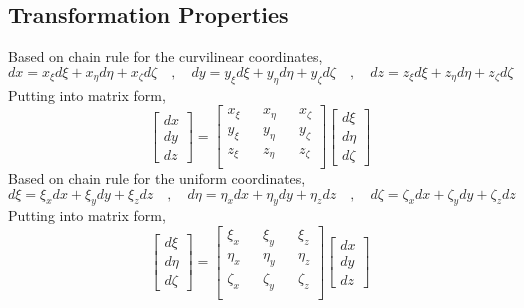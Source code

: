 \documentclass[a4paper, 12pt]{report}
\begin{document}
\begin{center}
\subsection{Transformation Properties}
\begin{comment}
Not Complete, Crammer's rule for all of the matrices are not writte down
\end{comment}
Based on chain rule for the curvilinear coordinates,
$$dx = x_{\xi}d\xi + x_{\eta}d\eta + x_{\zeta}d\zeta \quad,\quad dy = y_{\xi}d\xi + y_{\eta}d\eta + y_{\zeta}d\zeta \quad,\quad dz = z_{\xi}d\xi + z_{\eta}d\eta + z_{\zeta}d\zeta$$
Putting into matrix form,
\begin{equation}\begin{bmatrix}
dx \\ dy \\ dz
\end{bmatrix} = \begin{bmatrix}
x_{\xi} && x_{\eta} && x_{\zeta} \\
y_{\xi} && y_{\eta} && y_{\zeta} \\
z_{\xi} && z_{\eta} && z_{\zeta} \\
\end{bmatrix}\begin{bmatrix}
d\xi \\ d\eta \\ d\zeta
\end{bmatrix}
\label{curvilinear coordinate matrix}
\end{equation}
Based on chain rule for the uniform coordinates,
$$d\xi = \xi_{x}dx + \xi_{y}dy + \xi_{z}dz \quad,\quad d\eta = \eta_{x}dx + \eta_{y}dy + \eta_{z}dz \quad,\quad d\zeta = \zeta_{x}dx + \zeta_{y}dy + \zeta_{z}dz$$
Putting into matrix form,
\begin{equation}\begin{bmatrix}
d\xi \\ d\eta \\ d\zeta
\end{bmatrix} = \begin{bmatrix}
\xi_{x} && \xi_{y} && \xi_{z} \\
\eta_{x} && \eta_{y} && \eta_{z} \\
\zeta_{x} && \zeta_{y} && \zeta_{z} \\
\end{bmatrix}\begin{bmatrix}
dx \\ dy \\ dz
\end{bmatrix}

\end{equation}
\end{center}
\end{document}
